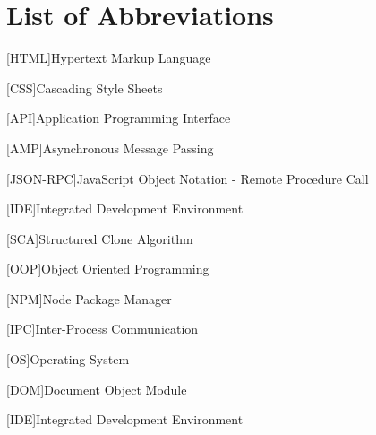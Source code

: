 \section{List of Abbreviations}
\label{sec:list-of-abbreviations}
\hfill
\begin{acronym}
    [HTML]{Hypertext Markup Language}
\end{acronym}

\begin{acronym}
    [CSS]{Cascading Style Sheets}
\end{acronym}

\begin{acronym}
    [API]{Application Programming Interface}
\end{acronym}

\begin{acronym}
    [AMP]{Asynchronous Message Passing}
\end{acronym}

\begin{acronym}
    [JSON-RPC]{JavaScript Object Notation - Remote Procedure Call}
\end{acronym}

\begin{acronym}
    [IDE]{Integrated Development Environment}
\end{acronym}

\begin{acronym}
    [SCA]{Structured Clone Algorithm}
\end{acronym}

\begin{acronym}
    [OOP]{Object Oriented Programming}
\end{acronym}

\begin{acronym}
    [NPM]{Node Package Manager}
\end{acronym}

\begin{acronym}
    [IPC]{Inter-Process Communication}
\end{acronym}

\begin{acronym}
    [OS]{Operating System}
\end{acronym}


\begin{acronym}
    [DOM]{Document Object Module}
\end{acronym}

\begin{acronym}
    [IDE]{Integrated Development Environment}
\end{acronym}

